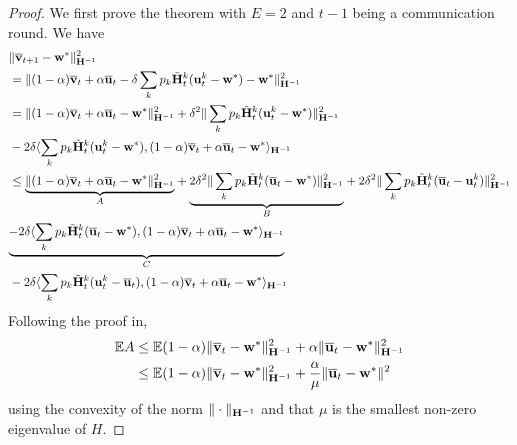 \begin{proof}
	We first prove the theorem with $E=2$ and $t-1$ being a communication
	round. We have 
	\begin{align*}
	& \|\overline{\mathbf{v}}_{t+1}-\mathbf{w}^{\ast}\|_{{\mathbf{H}}^{-1}}^{2}\\
	& =\|(1-\alpha){\overline{\mathbf{v}}}_{t}+\alpha{\overline{\mathbf{u}}}_{t}-\delta\sum_{k}p_{k}\tilde{{\mathbf{H}}}_{t}^{k}({\mathbf{u}}_{t}^{k}-{\mathbf{w}}^{\ast})-{\mathbf{w}}^{\ast}\|_{{\mathbf{H}}^{-1}}^{2}\\
	& =\|(1-\alpha){\overline{\mathbf{v}}}_{t}+\alpha{\overline{\mathbf{u}}}_{t}-{\mathbf{w}}^{\ast}\|_{{\mathbf{H}}^{-1}}^{2}+\delta^{2}\|\sum_{k}p_{k}\tilde{{\mathbf{H}}}_{t}^{k}({\mathbf{u}}_{t}^{k}-{\mathbf{w}}^{\ast})\|_{{\mathbf{H}}^{-1}}^{2}\\
	& -2\delta\langle\sum_{k}p_{k}\tilde{{\mathbf{H}}}_{t}^{k}({\mathbf{u}}_{t}^{k}-{\mathbf{w}}^{\ast}),(1-\alpha){\overline{\mathbf{v}}}_{t}+\alpha{\overline{\mathbf{u}}}_{t}-{\mathbf{w}}^{\ast}\rangle_{{\mathbf{H}}^{-1}}\\
	& \leq\underset{A}{\underbrace{\|(1-\alpha){\overline{\mathbf{v}}}_{t}+\alpha{\overline{\mathbf{u}}}_{t}-{\mathbf{w}}^{\ast}\|_{{\mathbf{H}}^{-1}}^{2}}}+\underset{B}{\underbrace{2\delta^{2}\|\sum_{k}p_{k}\tilde{{\mathbf{H}}}_{t}^{k}({\overline{\mathbf{u}}}_{t}-{\mathbf{w}}^{\ast})\|_{{\mathbf{H}}^{-1}}^{2}}}+2\delta^{2}\|\sum_{k}p_{k}\tilde{{\mathbf{H}}}_{t}^{k}({\overline{\mathbf{u}}}_{t}-{\mathbf{u}}_{t}^{k})\|_{{\mathbf{H}}^{-1}}^{2}\\
	& \underset{C}{\underbrace{-2\delta\langle\sum_{k}p_{k}\tilde{{\mathbf{H}}}_{t}^{k}({\overline{\mathbf{u}}}_{t}-{\mathbf{w}}^{\ast}),(1-\alpha){\overline{\mathbf{v}}}_{t}+\alpha{\overline{\mathbf{u}}}_{t}-{\mathbf{w}}^{\ast}\rangle_{{\mathbf{H}}^{-1}}}}\\
	& -2\delta\langle\sum_{k}p_{k}\tilde{{\mathbf{H}}}_{t}^{k}({\mathbf{u}}_{t}^{k}-{\overline{\mathbf{u}}}_{t}),(1-\alpha){\overline{\mathbf{v}}}_{t}+\alpha{\overline{\mathbf{u}}}_{t}-{\mathbf{w}}^{\ast}\rangle_{{\mathbf{H}}^{-1}}
	\end{align*}
	Following the proof in, 
	\begin{align*}
	\mathbb{E}A & \leq\mathbb{E}(1-\alpha)\|{\overline{\mathbf{v}}}_{t}-{\mathbf{w}}^{\ast}\|_{{\mathbf{H}}^{-1}}^{2}+\alpha\|{\overline{\mathbf{u}}}_{t}-{\mathbf{w}}^{\ast}\|_{{\mathbf{H}}^{-1}}^{2}\\
	& \leq\mathbb{E}(1-\alpha)\|{\overline{\mathbf{v}}}_{t}-{\mathbf{w}}^{\ast}\|_{{\mathbf{H}}^{-1}}^{2}+\frac{\alpha}{\mu}\|{\overline{\mathbf{u}}}_{t}-{\mathbf{w}}^{\ast}\|^{2}
	\end{align*}
	using the convexity of the norm $\|\cdot\|_{{\mathbf{H}}^{-1}}$ and that $\mu$
	is the smallest non-zero eigenvalue of $H$. 
	

\end{proof}
